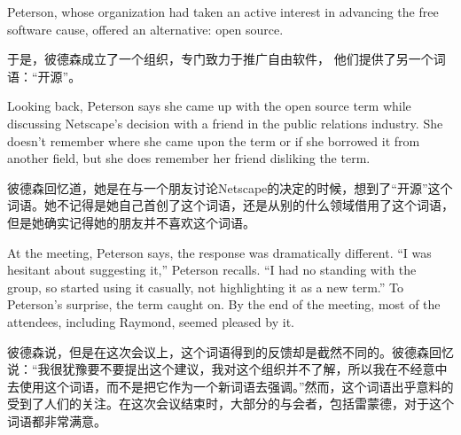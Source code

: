 
\ifdefined\eng
Peterson, whose organization had taken an active interest in advancing the free software cause, offered an alternative: open source.
\fi

\ifdefined\chs
于是，彼德森成立了一个组织，专门致力于推广自由软件， 他们提供了另一个词语：``开源''。
\fi

\ifdefined\eng
Looking back, Peterson says she came up with the open source term while discussing Netscape's decision with a friend in the public relations industry. She doesn't remember where she came upon the term or if she borrowed it from another field, but she does remember her friend disliking the term.
\fi

\ifdefined\chs
彼德森回忆道，她是在与一个朋友讨论Netscape的决定的时候，想到了``开源''这个词语。她不记得是她自己首创了这个词语，还是从别的什么领域借用了这个词语，但是她确实记得她的朋友并不喜欢这个词语。
\fi

\ifdefined\eng
At the meeting, Peterson says, the response was dramatically different. ``I was hesitant about suggesting it,'' Peterson recalls. ``I had no standing with the group, so started using it casually, not highlighting it as a new term.'' To Peterson's surprise, the term caught on. By the end of the meeting, most of the attendees, including Raymond, seemed pleased by it.
\fi

\ifdefined\chs
彼德森说，但是在这次会议上，这个词语得到的反馈却是截然不同的。彼德森回忆说：``我很犹豫要不要提出这个建议，我对这个组织并不了解，所以我在不经意中去使用这个词语，而不是把它作为一个新词语去强调。''然而，这个词语出乎意料的受到了人们的关注。在这次会议结束时，大部分的与会者，包括雷蒙德，对于这个词语都非常满意。
\fi

